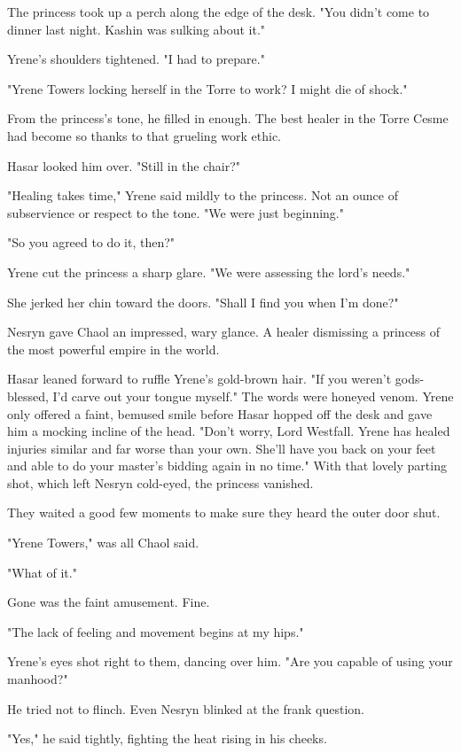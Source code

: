 The princess took up a perch along the edge of the desk.
"You didn't come to dinner last night.
Kashin was sulking about it."

Yrene's shoulders tightened.
"I had to prepare."

"Yrene Towers locking herself in the Torre to work?
I might die of shock."

From the princess's tone, he filled in enough.
The best healer in the Torre Cesme had become so thanks to that grueling work ethic.

Hasar looked him over.
"Still in the chair?"

"Healing takes time," Yrene said mildly to the princess.
Not an ounce of subservience or respect to the tone.
"We were just beginning."

"So you agreed to do it, then?"

Yrene cut the princess a sharp glare.
"We were assessing the lord's needs."

She jerked her chin toward the doors.
"Shall I find you when I'm done?"

Nesryn gave Chaol an impressed, wary glance.
A healer dismissing a princess of the most powerful empire in the world.

Hasar leaned forward to ruffle Yrene's gold-brown hair.
"If you weren't gods-blessed, I'd carve out your tongue myself."
The words were honeyed venom.
Yrene only offered a faint, bemused smile before Hasar hopped off the desk and gave him a mocking incline of the head.
"Don't worry, Lord Westfall.
Yrene has healed injuries similar and far worse than your own.
She'll have you back on your feet and able to do your master's bidding again in no time."
With that lovely parting shot, which left Nesryn cold-eyed, the princess vanished.

They waited a good few moments to make sure they heard the outer door shut.

"Yrene Towers," was all Chaol said.

"What of it."

Gone was the faint amusement.
Fine.

"The lack of feeling and movement begins at my hips."

Yrene's eyes shot right to them, dancing over him.
"Are you capable of using your manhood?"

He tried not to flinch.
Even Nesryn blinked at the frank question.

"Yes," he said tightly, fighting the heat rising in his cheeks.

